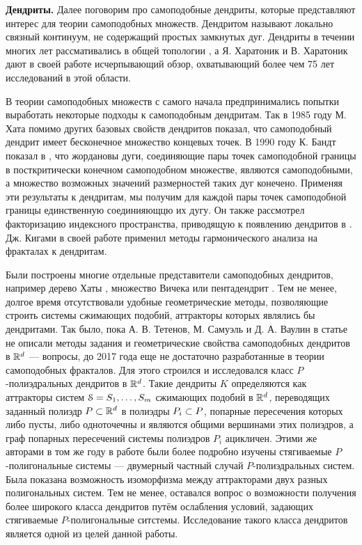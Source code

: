 {\bf Дендриты.}
Далее поговорим про самоподобные дендриты, которые представляют интерес для теории самоподобных множеств.
Дендритом называют локально связный континуум, не содержащий простых замкнутых дуг.
Дендриты в течении многих лет рассмативались в общей топологии \cite{Kur1, Kur2}, а Я. Харатоник и В. Харатоник дают в своей работе \cite{Char1998} исчерпывающий обзор, охватывающий более чем 75 лет исследований в этой области.

В теории самоподобных множеств с самого начала предпринимались попытки выработать некоторые подходы к самоподобным дендритам.
Так в 1985 году М. Хата \cite{Hata1985} помимо других базовых свойств дендритов показал, что самоподобный дендрит имеет бесконечное множество концевых точек.
В 1990 году К. Бандт показал в \cite{SSS6}, что жордановы дуги, соединяющие пары точек самоподобной границы в посткритически конечном самоподобном множестве, являются самоподобными, а множество возможных значений размерностей таких дуг конечено.
Применяя эти результаты к дендритам, мы получим для каждой пары точек самоподобной границы единственную соединияющцю их дугу.
Он также рассмотрел факторизацию индексного пространства, приводящую к появлению дендритов в \cite{SSS2}.
Дж. Кигами в своей работе \cite{Kig95} применил методы гармонического анализа на фракталах к дендритам. 

Были построены многие отдельные представители самоподобных дендритов, например дерево Хаты \cite{Hata1985}, множество Вичека или пентадендрит \cite{McWorter1987}.
Тем не менее, долгое время отсутствовали удобные геометрические методы, позволяющие строить системы сжимающих подобий, аттракторы которых являлись бы дендритами.
Так было, пока А. В. Тетенов, М. Самуэль и Д. А. Ваулин в статье \cite{TSV2017} не описали методы задания и геометрические свойства самоподобных дендритов в $\mathbb{R}^d$ --- вопросы, до 2017 года еще не достаточно разработанные в теории самоподобных фракталов. 
Для этого строился и исследовался класс $P$-полиэдральных дендритов в $\mathbb{R}^d$. 
Такие дендриты $K$ определяются как аттракторы систем ${\EuScript S} = {S_1,\ldots, S_m}$ сжимающих подобий в $\mathbb{R}^d$, переводящих заданный полиэдр $P \subset \mathbb{R}^d$ в полиэдры $P_i \subset P$, попарные пересечения которых либо пусты, либо одноточечны и являются общими вершинами этих полиэдров, а граф попарных пересечений системы полиэдров $P_i$ ацикличен.
Этими же авторами в том же году в работе \cite{STV2017} были более подробно изучены стягиваемые $P$-полигональные системы --- двумерный частный случай $P$-полиэдральных систем.
Была показана возможность изоморфизма между аттракторами двух разных полигональных систем.
Тем не менее, оставался вопрос о возможности получения более широкого класса дендритов путём ослабления условий, задающих стягиваемые $P$-полигональные ситстемы. 
Исследование такого класса дендритов является одной из целей данной работы.

